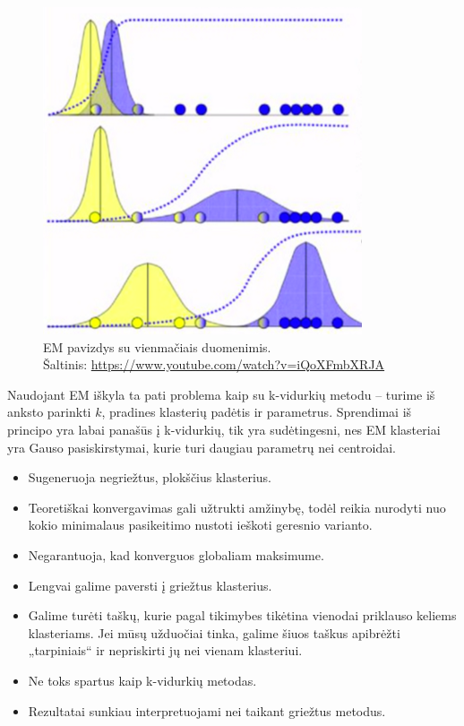 \documentclass{VUMIFInfKursinis}
\begin{document}
\begin{figure}[H]
	\centering
	\includegraphics[scale=.5]{img/EM1d}
	\caption{EM pavizdys su vienmačiais duomenimis.\\
			     Šaltinis: \url{https://www.youtube.com/watch?v=iQoXFmbXRJA}}
\end{figure}



Naudojant EM iškyla ta pati problema kaip su k-vidurkių metodu – turime
iš anksto parinkti $k$, pradines klasterių padėtis ir parametrus.
Sprendimai iš principo yra labai panašūs į k-vidurkių, tik yra
sudėtingesni, nes EM klasteriai yra Gauso pasiskirstymai, kurie turi
daugiau parametrų nei centroidai.


\begin{itemize}

\item
  Sugeneruoja negriežtus, plokščius klasterius.
\item
  Teoretiškai konvergavimas gali užtrukti amžinybę, todėl reikia
  nurodyti nuo kokio minimalaus pasikeitimo nustoti ieškoti geresnio
  varianto.
\item
  Negarantuoja, kad konverguos globaliam maksimume.
\item
  Lengvai galime paversti į griežtus klasterius.
\item
  Galime turėti taškų, kurie pagal tikimybes tikėtina vienodai priklauso
  keliems klasteriams. Jei mūsų užduočiai tinka, galime šiuos taškus
  apibrėžti „tarpiniais“ ir nepriskirti jų nei vienam klasteriui.
\item
  Ne toks spartus kaip k-vidurkių metodas.
\item
  Rezultatai sunkiau interpretuojami nei taikant griežtus metodus.
\end{itemize}
\end{document}
